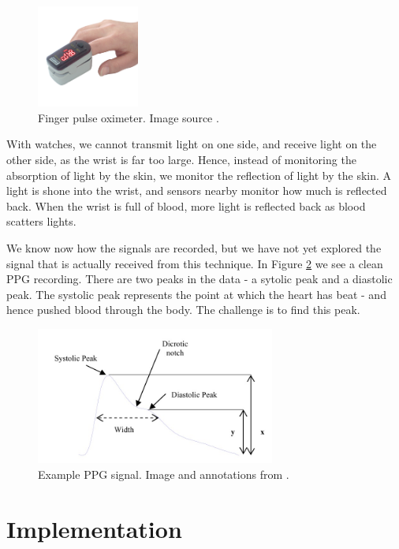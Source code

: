 \documentclass[12pt,a4paper,twoside,openright]{report}
\begin{document}
\begin{figure}[h!]
	\centerline{\includegraphics[width=0.3\textwidth]{figs/fingerppg.jpg}}
	\caption{Finger pulse oximeter. Image source \cite{wiki:fingerppg}.}
\label{fig:fingerppg}
\end{figure}

With watches, we cannot transmit light on one side, and
receive light on the other side, as the wrist is far too large. Hence, instead
of monitoring the absorption of light by the skin, we monitor the reflection
of light by the skin. A light is shone into the wrist, and sensors nearby
monitor how much is reflected back. When the wrist is full of blood, more
light is reflected back as blood scatters lights.

We know now how the signals are recorded, but we have not yet explored the
signal that is actually received from this technique. In Figure
\ref{fig:typicalppgsignal} we see a
clean PPG recording. There are two peaks in the data - a sytolic peak and a
diastolic peak. The systolic peak represents the point at which the heart has
beat - and hence pushed blood through the body. The challenge is to find this
peak.

\begin{figure}[h!]
	\centerline{\includegraphics[width=0.7\textwidth]{figs/typicalppgsignal.jpeg}}
	\caption{Example PPG signal. Image and annotations from \cite{elgendi12}.}
\label{fig:typicalppgsignal}
\end{figure}

\chapter{Implementation}
\end{document}
